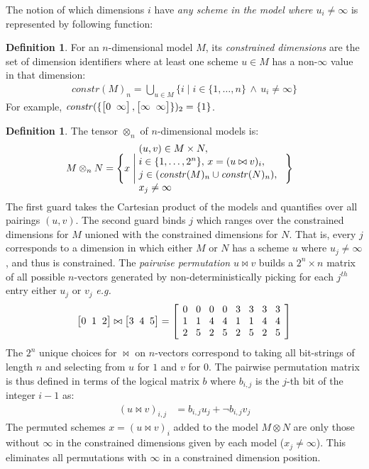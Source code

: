 \documentclass[10pt,preprint,numbers]{sigplanconf}
\newcounter{block}
\theoremstyle{definition}
\newtheorem{definition}[block]{Definition}
\newcommand{\eg}{\emph{e.g.}}
\newcommand{\vtwoh}[2]{\setlength{\arraycolsep}{0em}
\left[\begin{array}{cc}#1 \; & \; #2\end{array}\right]}
\newcommand{\vthreeh}[3]{\setlength{\arraycolsep}{0em}
\left[\begin{array}{ccc}#1 \; & \; #2 \; & \; #3\end{array}\right]}
\newcommand{\effdims}[2]{\mathit{constr}(#1)_{#2}}
\begin{document}
The notion of which dimensions $i$ have \emph{any scheme in the model
where $u_i \neq \infty$} is represented by following  function:
\begin{definition}%
For an $n$-dimensional model $M$, its \emph{constrained dimensions}
are the set of dimension identifiers where at least one scheme $u \in M$ has
a non-$\infty$ value in that dimension:
%
\begin{align*}
\effdims{M}{n} =
\bigcup_{u \in M} \{i \mid i \in \{1,\ldots,n\} \, \wedge \, u_i \neq
  \infty\}
\end{align*}
For example, $\effdims{\{\vtwoh{0}{\infty},\vtwoh{\infty}{\infty}\}}{2}
 = \{1\}$.
\end{definition}
\begin{definition}The tensor $\otimes_n$ of $n$-dimensional
models is:
\begin{alignat*}{2}
& M \otimes_n N =
  \Bigg\{x \; \Bigg| \;
    \parbox{5.2cm}{$(u, v) \in M \times N,$ \\[0.1em]
                  $\;\; i \in \{1, \ldots, 2^n\}, \,
                  x = (u \bowtie v)_i,$ \\[0.1em]
                  $\;\; j \in (\effdims{M}{n} \cup
                   \effdims{N}{n}),$\\[0.1em]
                   $\;\; x_j \neq \infty$
                  } \Bigg\}
\end{alignat*}
The first guard takes the Cartesian product of
the models and quantifies over all pairings $(u, v)$.
The second guard binds $j$ which ranges over the constrained
dimensions for $M$ unioned with the constrained dimensions for $N$.
That is, every $j$ corresponds to a dimension in which
either $M$ or $N$ has a scheme $u$ where $u_j \neq \infty$,
and thus is constrained.
The \emph{pairwise permutation} $u \bowtie v$
builds a $2^n \times n$ matrix
of all possible $n$-vectors generated by
non-deterministically picking for each $j^{th}$ entry either
$u_j$ or $v_j$ \eg{}
%
\begin{equation*}
\vthreeh{0}{1}{2} \bowtie \vthreeh{3}{4}{5} =
\left[
\setlength{\arraycolsep}{0.42em}
\begin{array}{cccccccc}
0 & 0 & 0 & 0 & 3 & 3 & 3 & 3 \\
1 & 1 & 4 & 4 & 1 & 1 & 4 & 4 \\
2 & 5 & 2 & 5 & 2 & 5 & 2 & 5
\end{array}
\right]
\end{equation*}
%
The $2^n$ unique choices for $\bowtie$ on $n$-vectors
correspond to taking all bit-strings of length $n$ and
selecting from $u$ for $1$ and $v$ for $0$. The pairwise permutation
matrix is thus defined in terms of the logical
matrix $b$ where $b_{i,j}$ is the $j$-th bit of the integer
$i - 1$ as:
%
\begin{align*}
(u \bowtie v)_{i,j} & = b_{i,j} u_j + \neg b_{i,j} v_j
\end{align*}
%
The permuted schemes $x = (u \bowtie v)_i$ added to the model
$M \otimes N$ are only those without $\infty$ in
the constrained dimensions given by each model ($x_j \neq
\infty$). This eliminates all permutations with
$\infty$ in a constrained dimension position.
\end{definition}
\end{document}
